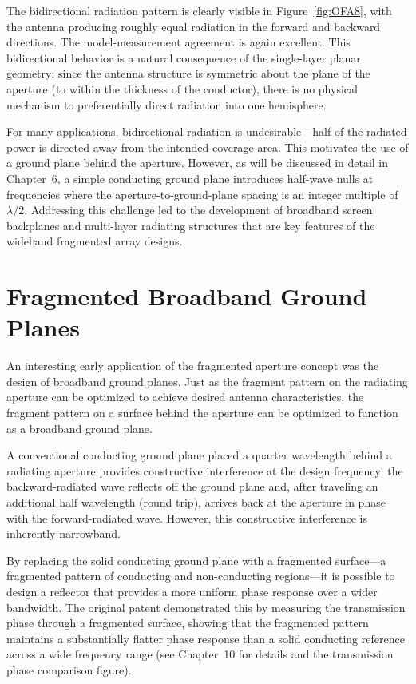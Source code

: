 The bidirectional radiation pattern is clearly visible in Figure~\ref{fig:OFA8}, with the antenna producing roughly equal radiation in the forward and backward directions.  The model-measurement agreement is again excellent.  This bidirectional behavior is a natural consequence of the single-layer planar geometry: since the antenna structure is symmetric about the plane of the aperture (to within the thickness of the conductor), there is no physical mechanism to preferentially direct radiation into one hemisphere.

For many applications, bidirectional radiation is undesirable---half of the radiated power is directed away from the intended coverage area.  This motivates the use of a ground plane behind the aperture.  However, as will be discussed in detail in Chapter~6, a simple conducting ground plane introduces half-wave nulls at frequencies where the aperture-to-ground-plane spacing is an integer multiple of $\lambda/2$.  Addressing this challenge led to the development of broadband screen backplanes and multi-layer radiating structures that are key features of the wideband fragmented array designs.

\section{Fragmented Broadband Ground Planes}

An interesting early application of the fragmented aperture concept was the design of broadband ground planes.  Just as the fragment pattern on the radiating aperture can be optimized to achieve desired antenna characteristics, the fragment pattern on a surface behind the aperture can be optimized to function as a broadband ground plane.

A conventional conducting ground plane placed a quarter wavelength behind a radiating aperture provides constructive interference at the design frequency: the backward-radiated wave reflects off the ground plane and, after traveling an additional half wavelength (round trip), arrives back at the aperture in phase with the forward-radiated wave.  However, this constructive interference is inherently narrowband.

By replacing the solid conducting ground plane with a fragmented surface---a fragmented pattern of conducting and non-conducting regions---it is possible to design a reflector that provides a more uniform phase response over a wider bandwidth.  The original patent demonstrated this by measuring the transmission phase through a fragmented surface, showing that the fragmented pattern maintains a substantially flatter phase response than a solid conducting reference across a wide frequency range (see Chapter~10 for details and the transmission phase comparison figure).


